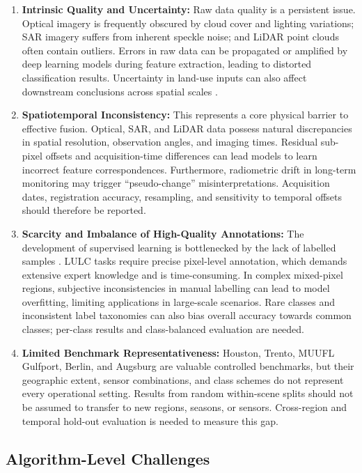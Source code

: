 \documentclass[]{interact}
\theoremstyle{plain}%
\theoremstyle{definition}
\theoremstyle{remark}
\begin{document}
\begin{enumerate}
	\item \textbf{Intrinsic Quality and Uncertainty:} Raw data quality is a persistent issue. Optical imagery is frequently obscured by cloud cover and lighting variations; SAR imagery suffers from inherent speckle noise; and LiDAR point clouds often contain outliers. Errors in raw data can be propagated or amplified by deep learning models during feature extraction, leading to distorted classification results. Uncertainty in land-use inputs can also affect downstream conclusions across spatial scales \citep{li2026landuncertainty}.
	\item \textbf{Spatiotemporal Inconsistency:} This represents a core physical barrier to effective fusion. Optical, SAR, and LiDAR data possess natural discrepancies in spatial resolution, observation angles, and imaging times. Residual sub-pixel offsets and acquisition-time differences can lead models to learn incorrect feature correspondences. Furthermore, radiometric drift in long-term monitoring may trigger ``pseudo-change'' misinterpretations. Acquisition dates, registration accuracy, resampling, and sensitivity to temporal offsets should therefore be reported.
	\item \textbf{Scarcity and Imbalance of High-Quality Annotations:} The development of supervised learning is bottlenecked by the lack of labelled samples \citep{56}. LULC tasks require precise pixel-level annotation, which demands extensive expert knowledge and is time-consuming. In complex mixed-pixel regions, subjective inconsistencies in manual labelling can lead to model overfitting, limiting applications in large-scale scenarios. Rare classes and inconsistent label taxonomies can also bias overall accuracy towards common classes; per-class results and class-balanced evaluation are needed.
	\item \textbf{Limited Benchmark Representativeness:} Houston, Trento, MUUFL Gulfport, Berlin, and Augsburg are valuable controlled benchmarks, but their geographic extent, sensor combinations, and class schemes do not represent every operational setting. Results from random within-scene splits should not be assumed to transfer to new regions, seasons, or sensors. Cross-region and temporal hold-out evaluation is needed to measure this gap.
\end{enumerate}


\subsection{Algorithm-Level Challenges}
\end{document}
